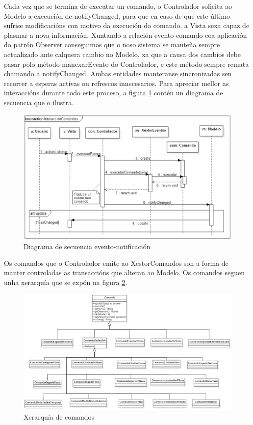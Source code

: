 Cada vez que se termina de executar un comando, o Controlador solicita ao Modelo a execución de notifyChanged, para que en caso de que este último sufrise modificacións con motivo da execución do comando, a Vista sexa capaz de plasmar a nova información. Xuntando a relación evento-comando coa aplicación do patrón Observer conseguimos que o noso sistema se manteña sempre actualizado ante calquera cambio no Modelo, xa que a causa dos cambios debe pasar polo método manexarEvento do Controlador, e este método sempre remata chamando a notifyChanged. Ambas entidades manteranse sincronizadas sen recorrer a esperas activas ou refrescos innecesarios. Para apreciar mellor as interaccións durante todo este proceso, a figura \ref{DScomandos} contén un diagrama de secuencia que o ilustra.

\begin{figure}
\centering
\includegraphics[width=\textwidth,height=\textheight,keepaspectratio]{figuras/DScomandos}
\caption{Diagrama de secuencia evento-notificación}
\label{DScomandos}
\end{figure}

Os comandos que o Controlador emite ao XestorComandos son a forma de manter controladas as transaccións que alteran ao Modelo. Os comandos seguen unha xerarquía que se expón na figura \ref{xerarquiaComandos}.

\begin{figure}
\centering
\includegraphics[width=\textwidth,height=\textheight,keepaspectratio]{figuras/xerarquiaComandos}
\caption{Xerarquía de comandos}
\label{xerarquiaComandos}
\end{figure}

